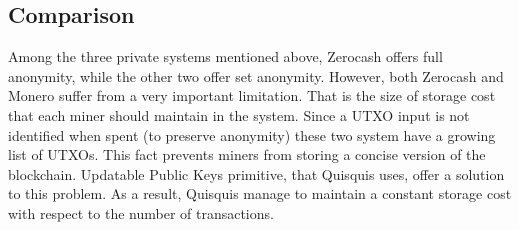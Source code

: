 \subsection{Comparison}

Among the three private systems mentioned above, Zerocash offers full anonymity, while the other two offer set anonymity. However, both Zerocash and Monero suffer from a very important limitation. That is the size of storage cost that each miner should maintain in the system. Since a UTXO input is not identified when spent (to preserve anonymity) these two system have a growing list of UTXOs. This fact prevents miners from storing a concise version of the blockchain. Updatable Public Keys primitive, that Quisquis uses, offer a solution to this problem. As a result, Quisquis manage to maintain a constant storage cost with respect to the number of transactions.